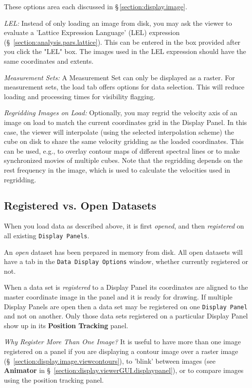 These options area each discussed in \S\,\ref{section:display.image}.

{\em LEL:} Instead of only loading an image from disk, you may ask the
viewer to evaluate a 'Lattice Expression Language' (LEL) expression (\S~\ref{section:analysis.pars.lattice}). This can
be entered in the box provided after you click the "LEL" box. The images used in the
LEL expression should have the same coordinates and extents. 

{\em Measurement Sets:} A Measurement Set can only be displayed as a raster. For 
measurement sets, the load tab offers options for data selection. This will reduce 
loading and processing times for visibility flagging.  

{\em Regridding Images on Load:} Optionally, you may regrid the velocity axis of an image 
on load to match the current coordinates grid in the Display Panel. In this case, the viewer
will interpolate (using the selected interpolation scheme) the cube on disk to share the 
same velocity gridding as the loaded coordinates. This can be used, e.g., to overlay contour
maps of different spectral lines or to make synchronized movies of multiple cubes. Note that
the regridding depends on the rest frequency in the image, which is used to calculate the
velocities used in regridding. 

\subsection{Registered vs. Open Datasets}
\label{section:display.viewerGUI.load.register}

When you load data as described above, it is first {\em opened}, and then
{\em registered} on all existing {\tt Display Panels}.  

An {\em open} dataset has been prepared in memory from disk.  All open datasets will 
have a tab in the {\tt Data Display Options} window, whether currently registered or not.  

When a data set is {\em registered} to a Display Panel its coordinates are aligned to
the master coordinate image in the panel and it is ready for drawing. If multiple Display Panels are open
then a data set may be registered on one {\tt Display Panel} and not on another. Only those
data sets registered on a particular Display Panel show up in its {\bf Position Tracking}
panel.

{\em Why Register More Than One Image?} It is useful to have more than one image registered on a
panel if you are displaying a contour image over a raster image
(\S~\ref{section:display.image.viewcontours}), to 'blink' between images
(see {\bf Animator} in \S~\ref{section:display.viewerGUI.displaypanel}), or to compare images
using the position tracking panel.

